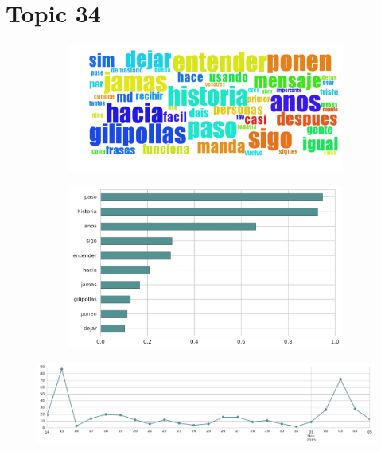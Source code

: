 \section{Topic 34}

\begin{figure}[htbp!]
    \centering
    \begin{subfigure}[b]{0.49\textwidth}
        \includegraphics[width=\textwidth]{twitter_all/report_images/topic-34-wordcloud.jpg}
    \end{subfigure}
    \begin{subfigure}[b]{0.49\textwidth}
        \includegraphics[width=\textwidth]{twitter_all/report_images/topic-34-terms.jpg}
    \end{subfigure}
\end{figure}

\begin{figure}[htbp!]
    \centering
    \includegraphics[width=\textwidth]{twitter_all/report_images/topic-34-timeseries.jpg}
\end{figure}

